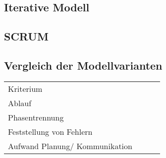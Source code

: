 \subsection{Iterative Modell}

\subsection{SCRUM}

\subsection{Vergleich der Modellvarianten}
\begin{tabular}{llll}
    Kriterium   \\
    Ablauf    \\
    Phasentrennung\\
    Feststellung von Fehlern\\
    Aufwand Planung/ Kommunikation\\
\end{tabular}
